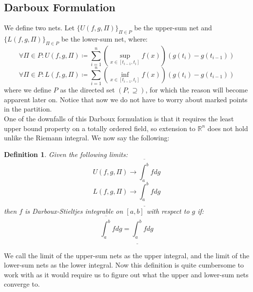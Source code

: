 \documentclass[10pt,letterpaper]{article} %
\newtheorem{defn}{Definition}[section]
\begin{document}
\subsection{Darboux Formulation}
We define two nets. Let $\{U(f, g, \Pi)\}_{\Pi \in P}$ be the upper-sum net and $\{L(f, g, \Pi)\}_{\Pi \in P}$ be the lower-sum net, where:
\begin{equation*}
\forall \Pi \in P: U(f, g, \Pi) \coloneq \sum_{i=1}^{n}\left(\sup_{x \in [t_{i-1}, t_i]}f(x)\right) (g(t_i) - g(t_{i-1}))
\end{equation*}
\begin{equation*}
\forall \Pi \in P: L(f, g, \Pi) \coloneq \sum_{i=1}^{n}\left(\inf_{x \in [t_{i-1}, t_i]}f(x)\right) (g(t_i) - g(t_{i-1}))
\end{equation*}
where we define $P$ as the directed set $(P, \supseteq)$, for which the reason will become apparent later on. Notice that now we do not have to worry about marked points in the partition.\\

One of the downfalls of this Darboux formulation is that it requires the least upper bound property on a totally ordered field, so extension to $\mathbb{R}^n$ does not hold unlike the Riemann integral. We now say the following:
\begin{defn}
Given the following limits:
\begin{equation*}
U(f, g, \Pi) \xrightarrow{} \overline{\int_{a}^{b}}f dg
\end{equation*}
\begin{equation*}
L(f, g, \Pi) \xrightarrow{} \underline{\int_{a}^{b}}f dg
\end{equation*}
then $f$ is Darboux-Stieltjes integrable on $[a, b]$ with respect to $g$ if:
\begin{equation*}
\overline{\int_{a}^{b}}fdg = \underline{\int_{a}^{b}}fdg
\end{equation*}
\end{defn}
We call the limit of the upper-sum nets as the upper integral, and the limit of the lower-sum nets as the lower integral. Now this definition is quite cumbersome to work with as it would require us to figure out what the upper and lower-sum nets converge to.\\
\end{document}
